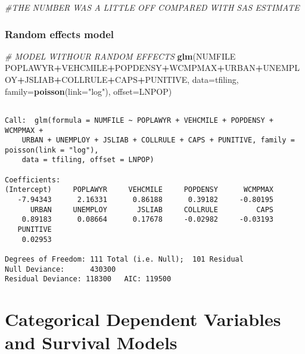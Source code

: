 \documentclass[]{book}
\newenvironment{Shaded}{\begin{snugshade}}{\end{snugshade}}
\newcommand{\CommentTok}[1]{\textcolor[rgb]{0.56,0.35,0.01}{\textit{#1}}}
\newcommand{\DataTypeTok}[1]{\textcolor[rgb]{0.13,0.29,0.53}{#1}}
\newcommand{\KeywordTok}[1]{\textcolor[rgb]{0.13,0.29,0.53}{\textbf{#1}}}
\newcommand{\NormalTok}[1]{#1}
\newcommand{\OperatorTok}[1]{\textcolor[rgb]{0.81,0.36,0.00}{\textbf{#1}}}
\newcommand{\StringTok}[1]{\textcolor[rgb]{0.31,0.60,0.02}{#1}}
\begin{document}
\begin{Shaded}
\begin{Highlighting}[]
\CommentTok{#THE NUMBER WAS A LITTLE OFF COMPARED WITH SAS ESTIMATE}
\end{Highlighting}
\end{Shaded}

\hypertarget{random-effects-model}{%
\subsection{Random effects model}\label{random-effects-model}}

\begin{Shaded}
\begin{Highlighting}[]
\CommentTok{# MODEL WITHOUR RANDOM EFFECTS}
\KeywordTok{glm}\NormalTok{(NUMFILE }\OperatorTok{~}\StringTok{ }\NormalTok{POPLAWYR}\OperatorTok{+}\NormalTok{VEHCMILE}\OperatorTok{+}\NormalTok{POPDENSY}\OperatorTok{+}\NormalTok{WCMPMAX}\OperatorTok{+}\NormalTok{URBAN}\OperatorTok{+}\NormalTok{UNEMPLOY}\OperatorTok{+}\NormalTok{JSLIAB}\OperatorTok{+}\NormalTok{COLLRULE}\OperatorTok{+}\NormalTok{CAPS}\OperatorTok{+}\NormalTok{PUNITIVE, }\DataTypeTok{data=}\NormalTok{tfiling, }\DataTypeTok{family=}\KeywordTok{poisson}\NormalTok{(}\DataTypeTok{link=}\StringTok{"log"}\NormalTok{), }\DataTypeTok{offset=}\NormalTok{LNPOP)}
\end{Highlighting}
\end{Shaded}

\begin{verbatim}

Call:  glm(formula = NUMFILE ~ POPLAWYR + VEHCMILE + POPDENSY + WCMPMAX + 
    URBAN + UNEMPLOY + JSLIAB + COLLRULE + CAPS + PUNITIVE, family = poisson(link = "log"), 
    data = tfiling, offset = LNPOP)

Coefficients:
(Intercept)     POPLAWYR     VEHCMILE     POPDENSY      WCMPMAX  
   -7.94343      2.16331      0.86188      0.39182     -0.80195  
      URBAN     UNEMPLOY       JSLIAB     COLLRULE         CAPS  
    0.89183      0.08664      0.17678     -0.02982     -0.03193  
   PUNITIVE  
    0.02953  

Degrees of Freedom: 111 Total (i.e. Null);  101 Residual
Null Deviance:      430300 
Residual Deviance: 118300   AIC: 119500
\end{verbatim}

\hypertarget{categorical-dependent-variables-and-survival-models}{%
\chapter{Categorical Dependent Variables and Survival Models}\label{categorical-dependent-variables-and-survival-models}}
\end{document}
